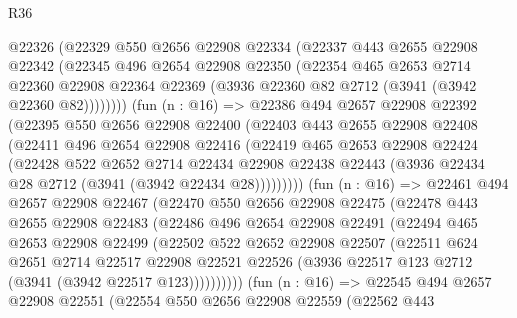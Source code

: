 \begin{lexlean}{R36}
\begin{coremodule}
          @22326
          (@22329
            @550
            @2656
            @22908
            @22334
            (@22337
              @443
              @2655
              @22908
              @22342
              (@22345
                @496
                @2654
                @22908
                @22350
                (@22354
                  @465
                  @2653
                  @2714
                  @22360
                  @22908
                  @22364
                  @22369
                  (@3936 @22360 @82 @2712 (@3941 (@3942 @22360 @82))))))))
        (fun (n : @16) =>
        @22386
          @494
          @2657
          @22908
          @22392
          (@22395
            @550
            @2656
            @22908
            @22400
            (@22403
              @443
              @2655
              @22908
              @22408
              (@22411
                @496
                @2654
                @22908
                @22416
                (@22419
                  @465
                  @2653
                  @22908
                  @22424
                  (@22428
                    @522
                    @2652
                    @2714
                    @22434
                    @22908
                    @22438
                    @22443
                    (@3936 @22434 @28 @2712 (@3941 (@3942 @22434 @28)))))))))
        (fun (n : @16) =>
        @22461
          @494
          @2657
          @22908
          @22467
          (@22470
            @550
            @2656
            @22908
            @22475
            (@22478
              @443
              @2655
              @22908
              @22483
              (@22486
                @496
                @2654
                @22908
                @22491
                (@22494
                  @465
                  @2653
                  @22908
                  @22499
                  (@22502
                    @522
                    @2652
                    @22908
                    @22507
                    (@22511
                      @624
                      @2651
                      @2714
                      @22517
                      @22908
                      @22521
                      @22526
                      (@3936 @22517 @123 @2712 (@3941 (@3942 @22517 @123))))))))))
        (fun (n : @16) =>
        @22545
          @494
          @2657
          @22908
          @22551
          (@22554
            @550
            @2656
            @22908
            @22559
            (@22562
              @443

\end{coremodule}
\end{lexlean}

